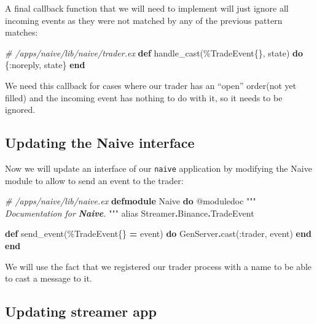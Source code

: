 \documentclass[
]{book}
\newenvironment{Shaded}{\begin{snugshade}}{\end{snugshade}}
\newcommand{\CommentTok}[1]{\textcolor[rgb]{0.56,0.35,0.01}{\textit{#1}}}
\newcommand{\ConstantTok}[1]{\textcolor[rgb]{0.00,0.00,0.00}{#1}}
\newcommand{\ImportTok}[1]{#1}
\newcommand{\InformationTok}[1]{\textcolor[rgb]{0.56,0.35,0.01}{\textbf{\textit{#1}}}}
\newcommand{\KeywordTok}[1]{\textcolor[rgb]{0.13,0.29,0.53}{\textbf{#1}}}
\newcommand{\NormalTok}[1]{#1}
\newcommand{\OperatorTok}[1]{\textcolor[rgb]{0.81,0.36,0.00}{\textbf{#1}}}
\newcommand{\OtherTok}[1]{\textcolor[rgb]{0.56,0.35,0.01}{#1}}
\newcommand{\VariableTok}[1]{\textcolor[rgb]{0.00,0.00,0.00}{#1}}
\begin{document}
A final callback function that we will need to implement will just ignore all
incoming events as they were not matched by any of the previous pattern matches:

\begin{Shaded}
\begin{Highlighting}[]
  \CommentTok{\# /apps/naive/lib/naive/trader.ex}
  \KeywordTok{def}\NormalTok{ handle\_cast(\%}\ConstantTok{TradeEvent}\NormalTok{\{\}, state) }\KeywordTok{do}
\NormalTok{    \{}\VariableTok{:noreply}\NormalTok{, state\}}
  \KeywordTok{end}
\end{Highlighting}
\end{Shaded}

We need this callback for cases where our trader has an ``open'' order(not yet filled) and the incoming event has nothing to do with it, so it needs to be ignored.

\hypertarget{updating-the-naive-interface}{%
\subsection{Updating the Naive interface}\label{updating-the-naive-interface}}

Now we will update an interface of our \texttt{naive} application by modifying the Naive module to allow to send an event to the trader:

\begin{Shaded}
\begin{Highlighting}[]
\CommentTok{\# /apps/naive/lib/naive.ex}
\KeywordTok{defmodule} \ConstantTok{Naive} \KeywordTok{do}
  \OtherTok{@moduledoc """}
\CommentTok{  Documentation for }\InformationTok{\textasciigrave{}Naive\textasciigrave{}}\CommentTok{.}
\CommentTok{  }\OtherTok{"""}
  \ImportTok{alias} \ConstantTok{Streamer}\OperatorTok{.}\ConstantTok{Binance}\OperatorTok{.}\ConstantTok{TradeEvent}

  \KeywordTok{def}\NormalTok{ send\_event(\%}\ConstantTok{TradeEvent}\NormalTok{\{\} }\OperatorTok{=}\NormalTok{ event) }\KeywordTok{do}
    \ConstantTok{GenServer}\OperatorTok{.}\NormalTok{cast(}\VariableTok{:trader}\NormalTok{, event)}
  \KeywordTok{end}
\KeywordTok{end}
\end{Highlighting}
\end{Shaded}

We will use the fact that we registered our trader process with a name to be able to cast a message to it.

\hypertarget{updating-streamer-app}{%
\subsection{Updating streamer app}\label{updating-streamer-app}}
\end{document}
